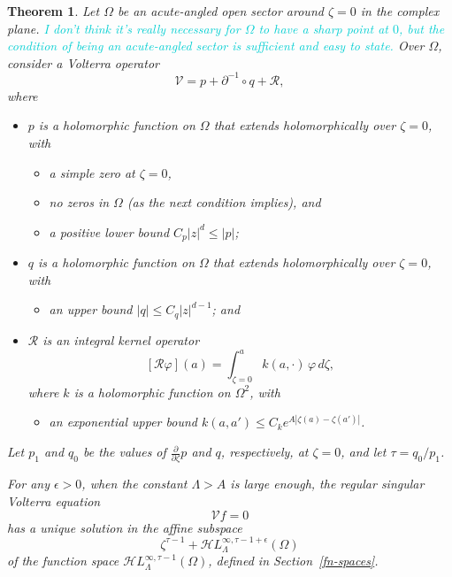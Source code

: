 \documentclass{article}
\theoremstyle{plain}
\newtheorem{thm}{Theorem}
\newcommand{\holoL}[1]{\mathcal{H}L^{#1}} %
\begin{document}
\begin{thm}
Let $\Omega$ be an acute-angled open sector around $\zeta = 0$ in the complex plane. \textcolor{DarkTurquoise}{I don't think it's really necessary for $\Omega$ to have a sharp point at $0$, but the condition of being an acute-angled sector is sufficient and easy to state.} Over $\Omega$, consider a Volterra operator
\[ \mathcal{V} = p + \partial^{-1} \circ q + \mathcal{R}, \]
where
\begin{itemize}
\item $p$ is a holomorphic function on $\Omega$ that extends holomorphically over $\zeta = 0$, with
\begin{itemize}
\item a simple zero at $\zeta = 0$,
\item no zeros in $\Omega$ (as the next condition implies), and
\item a positive lower bound $C_p |z|^d \le |p|$;
\end{itemize}
\item $q$ is a holomorphic function on $\Omega$ that extends holomorphically over $\zeta = 0$, with
\begin{itemize}
\item an upper bound $|q| \le C_q |z|^{d-1}$; and
\end{itemize}
\item $\mathcal{R}$ is an integral kernel operator
\[ [\mathcal{R}\varphi](a) = \int_{\zeta = 0}^{a} k(a, \cdot)\,\varphi\,d\zeta, \]
where $k$ is a holomorphic function on $\Omega^2$, with
\begin{itemize}
\item an exponential upper bound $k(a, a') \le C_k e^{A|\zeta(a) - \zeta(a')|}$.
\end{itemize}
\end{itemize}
Let $p_1$ and $q_0$ be the values of $\tfrac{\partial}{\partial \zeta} p$ and $q$, respectively, at $\zeta = 0$, and let $\tau = q_0 / p_1$.

For any $\epsilon > 0$, when the constant $\Lambda > A$ is large enough, the regular singular Volterra equation
\[ \mathcal{V}f = 0 \]
has a unique solution in the affine subspace
\[ \zeta^{\tau-1} + \holoL{\infty, \tau-1+\epsilon}_\Lambda(\Omega) \]
of the function space $\holoL{\infty, \tau-1}_\Lambda(\Omega)$, defined in Section~\ref{fn-spaces}.
\end{thm}
\end{document}
